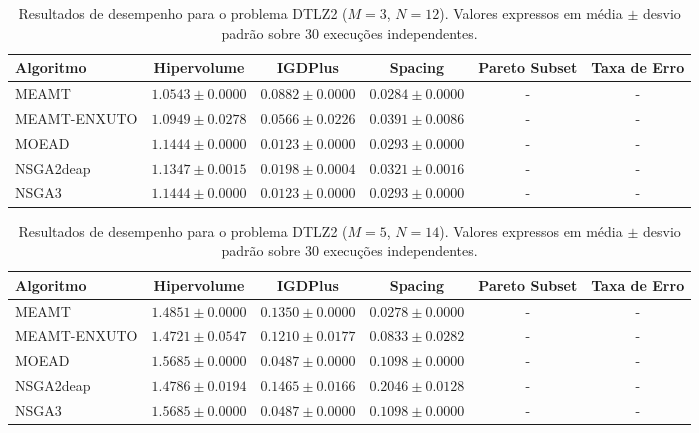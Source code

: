 \begin{table}[htpb]
\centering
\caption{Resultados de desempenho para o problema DTLZ2 ($M=3$, $N=12$). Valores expressos em média $\pm$ desvio padrão sobre 30 execuções independentes.}
\label{tab:DTLZ2_M3_N12}
\begin{tabular}{lccccc}
\hline\hline
Algoritmo & Hipervolume & IGDPlus & Spacing & Pareto Subset & Taxa de Erro \\
\hline
MEAMT & $1.0543 \pm 0.0000$ & $0.0882 \pm 0.0000$ & $0.0284 \pm 0.0000$ & - & - \\
MEAMT-ENXUTO & $1.0949 \pm 0.0278$ & $0.0566 \pm 0.0226$ & $0.0391 \pm 0.0086$ & - & - \\
MOEAD & $1.1444 \pm 0.0000$ & $0.0123 \pm 0.0000$ & $0.0293 \pm 0.0000$ & - & - \\
NSGA2deap & $1.1347 \pm 0.0015$ & $0.0198 \pm 0.0004$ & $0.0321 \pm 0.0016$ & - & - \\
NSGA3 & $1.1444 \pm 0.0000$ & $0.0123 \pm 0.0000$ & $0.0293 \pm 0.0000$ & - & - \\
\hline\hline
\end{tabular}
\end{table}

\begin{table}[htpb]
\centering
\caption{Resultados de desempenho para o problema DTLZ2 ($M=5$, $N=14$). Valores expressos em média $\pm$ desvio padrão sobre 30 execuções independentes.}
\label{tab:DTLZ2_M5_N14}
\begin{tabular}{lccccc}
\hline\hline
Algoritmo & Hipervolume & IGDPlus & Spacing & Pareto Subset & Taxa de Erro \\
\hline
MEAMT & $1.4851 \pm 0.0000$ & $0.1350 \pm 0.0000$ & $0.0278 \pm 0.0000$ & - & - \\
MEAMT-ENXUTO & $1.4721 \pm 0.0547$ & $0.1210 \pm 0.0177$ & $0.0833 \pm 0.0282$ & - & - \\
MOEAD & $1.5685 \pm 0.0000$ & $0.0487 \pm 0.0000$ & $0.1098 \pm 0.0000$ & - & - \\
NSGA2deap & $1.4786 \pm 0.0194$ & $0.1465 \pm 0.0166$ & $0.2046 \pm 0.0128$ & - & - \\
NSGA3 & $1.5685 \pm 0.0000$ & $0.0487 \pm 0.0000$ & $0.1098 \pm 0.0000$ & - & - \\
\hline\hline
\end{tabular}
\end{table}

